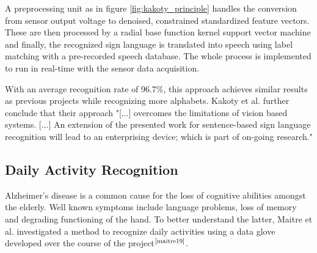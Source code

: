 \documentclass[hyperref, bachelorofscience]{cgvpub}
\newcommand{\newcite}[1]{$ ^{\text{\cite{#1}}} $}
\begin{document}
A preprocessing unit as in figure \ref{fig:kakoty_principle} handles the conversion from sensor output voltage to denoised, constrained standardized feature vectors. These are then processed by a radial base function kernel support vector machine and finally, the recognized sign language is translated into speech using label matching with a pre-recorded speech database. The whole process is implemented to run in real-time with the sensor data acquisition.

With an average recognition rate of 96.7\%, this approach achieves similar results as previous projects while recognizing more alphabets. Kakoty et al. further conclude that their approach "[$\dots$] overcomes the limitations of vision based systems. [$\dots$] An extension of the presented work for sentence-based sign language recognition will lead to an enterprising device; which is part of on-going research."

\subsection{Daily Activity Recognition}
Alzheimer's disease is a common cause for the loss of cognitive abilities amongst the elderly. Well known symptoms include language problems, loss of memory and degrading functioning of the hand. To better understand the latter, Maitre et al. investigated a method to recognize daily activities using a data glove developed over the course of the project\newcite{maitre19}.
\end{document}
